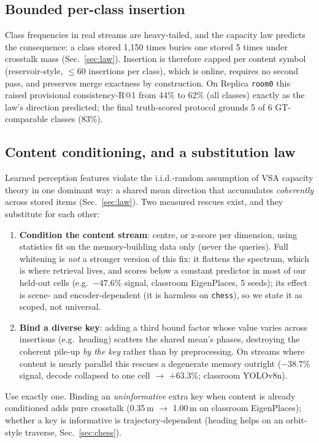\documentclass[conference]{IEEEtran}
\begin{document}
\subsection{Bounded per-class insertion}
\label{sec:bounded}

Class frequencies in real streams are heavy-tailed, and the capacity law
predicts the consequence: a class stored 1{,}150 times buries one stored
5 times under crosstalk mass (Sec.~\ref{sec:law}). Insertion is therefore
capped per content symbol (reservoir-style, $\le 60$ insertions per
class), which is online, requires no second pass, and preserves merge
exactness by construction. On Replica \texttt{room0} this raised
provisional consistency-R@1 from 44\% to 62\% (all classes) exactly as
the law's direction predicted; the final truth-scored protocol grounds
5 of 6 GT-comparable classes (83\%).

\subsection{Content conditioning, and a substitution law}
\label{sec:conditioning}

Learned perception features violate the i.i.d.-random assumption of VSA
capacity theory in one dominant way: a shared mean direction that
accumulates \emph{coherently} across stored items
(Sec.~\ref{sec:law}). Two measured rescues exist, and they substitute for
each other:
\begin{enumerate}
\item \textbf{Condition the content stream}: centre, or z-score per
  dimension, using statistics fit on the memory-building data only
  (never the queries). Full whitening is \emph{not} a stronger version of
  this fix: it flattens the spectrum, which is where retrieval lives,
  and scores below a constant predictor in most of our held-out cells
  (e.g.\ $-47.6\%$ signal, classroom EigenPlaces, 5 seeds); its effect
  is scene- and encoder-dependent (it is harmless on \texttt{chess}), so
  we state it as scoped, not universal.
\item \textbf{Bind a diverse key}: adding a third bound factor whose
  value varies across insertions (e.g.\ heading) scatters the shared
  mean's phases, destroying the coherent pile-up \emph{by the key}
  rather than by preprocessing. On streams where content is nearly
  parallel this rescues a degenerate memory outright ($-38.7\%$
  signal, decode collapsed to one cell $\to$ $+63.3\%$; classroom
  YOLOv8n).
\end{enumerate}
Use exactly one. Binding an \emph{uninformative} extra key when content
is already conditioned adds pure crosstalk (0.35\,m $\to$ 1.00\,m on
classroom EigenPlaces); whether a key is informative is
trajectory-dependent (heading helps on an orbit-style traverse,
Sec.~\ref{sec:chess}).
\end{document}

